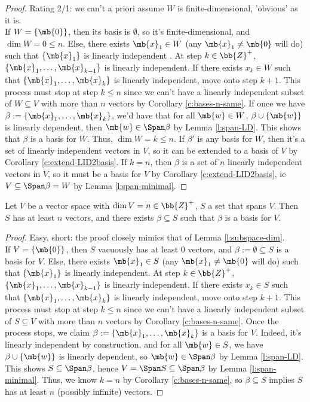 \begin{proof}
Rating 2/1: we can't a priori assume $W$ is finite-dimensional, 'obvious' as it is.\\
If $W= \{ \mb{0}\}$, then its basis is $\emptyset$, so it's finite-dimensional, and $\dim W=0 \leq n$.
Else, there exists $\mb{x}_1 \in W$ (any $\mb{x}_1 \neq \mb{0}$ will do) such that $\{ \mb{x}_1 \}$ is linearly independent . At step $k \in \bb{Z}^+$, $\{ \mb{x}_1, \ldots, \mb{x}_{k-1}\}$ is linearly independent. If there exists $x_k \in W$ such that $\{ \mb{x}_1, \ldots, \mb{x}_k \}$ is linearly independent, move onto step $k+1$.
This process must stop at step $k \leq n$ since we can't have a linearly independent subset of $W \subseteq V$ with more than $n$ vectors by Corollary \ref{c:bases-n-same}.
If once we have $\beta:= \{ \mb{x}_1, \ldots, \mb{x}_k \}$, we'd have that for all $\mb{w}\in W$, $\beta \cup \{ \mb{w}\}$ is linearly dependent, then $\mb{w}\in \Span \beta$ by Lemma \ref{l:span-LD}. This shows that $\beta$ is a basis for $W$. Thus, $\dim W=k \leq n$.
If $\beta'$ is any basis for $W$, then it's a set of linearly independent vectors in $V$, so it can be extended to a basis of $V$ by Corollary \ref{c:extend-LID2basis}.
If $k=n$, then $\beta$ is a set of $n$ linearly independent vectors in $V$, so it must be a basis for $V$ by Corollary \ref{c:extend-LID2basis}, ie $V \subseteq \Span \beta =W$ by Lemma \ref{l:span-minimal}.
\end{proof}
\begin{lem}
Let $V$ be a vector space with $\dim V=n \in \bb{Z}^+$, $S$ a set that spans $V$. Then $S$ has at least $n$ vectors, and there exists $\beta \subseteq S$ such that $\beta$ is a basis for $V$.
\end{lem}
\begin{proof}
Easy, short: the proof closely mimics that of Lemma \ref{l:subspace-dim}.\\
If $V= \{ \mb{0}\}$, then $S$ vacuously has at least 0 vectors, and $\beta:= \emptyset \subseteq S$ is a basis for $V$. Else, there exists $\mb{x}_1 \in S$ (any $\mb{x}_1 \neq \mb{0}$ will do) such that $\{ \mb{x}_1 \}$ is linearly independent.
At step $k \in \bb{Z}^+$, $\{ \mb{x}_1, \ldots, \mb{x}_{k-1}\}$ is linearly independent. If there exists $x_k \in S$ such that $\{ \mb{x}_1, \ldots, \mb{x}_k \}$ is linearly independent, move onto step $k+1$.
This process must stop at step $k \leq n$ since we can't have a linearly independent subset of $S \subseteq V$ with more than $n$ vectors by Corollary \ref{c:bases-n-same}.
Once the process stops, we claim $\beta:= \{ \mb{x}_1, \ldots, \mb{x}_k \}$ is a basis for $V$. Indeed, it's linearly independent by construction, and for all $\mb{w}\in S$, we have $\beta \cup \{ \mb{w}\}$ is linearly dependent, so $\mb{w}\in \Span \beta$ by Lemma \ref{l:span-LD}. This shows $S \subseteq \Span \beta$, hence $V= \Span S \subseteq \Span \beta$ by Lemma \ref{l:span-minimal}.
Thus, we know $k=n$ by Corollary \ref{c:bases-n-same}, so $\beta \subseteq S$ implies $S$ has at least $n$ (possibly infinite) vectors.
\end{proof}
